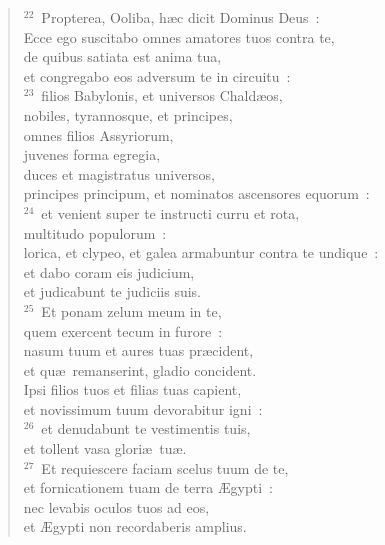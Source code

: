 \begin{verse}${}^{22}$~Propterea, Ooliba, h\ae c dicit Dominus Deus~:\\ Ecce ego suscitabo omnes amatores tuos contra te,\\ de quibus satiata est anima tua,\\ et congregabo eos adversum te in circuitu~:\\
${}^{23}$~filios Babylonis, et universos Chald\ae os,\\ nobiles, tyrannosque, et principes,\\ omnes filios Assyriorum,\\ juvenes forma egregia,\\ duces et magistratus universos,\\ principes principum, et nominatos ascensores equorum~:\\
${}^{24}$~et venient super te instructi curru et rota,\\ multitudo populorum~:\\ lorica, et clypeo, et galea armabuntur contra te undique~:\\ et dabo coram eis judicium,\\ et judicabunt te judiciis suis.\\
${}^{25}$~Et ponam zelum meum in te,\\ quem exercent tecum in furore~:\\ nasum tuum et aures tuas pr\ae cident,\\ et qu\ae\ remanserint, gladio concident.\\ Ipsi filios tuos et filias tuas capient,\\ et novissimum tuum devorabitur igni~:\\
${}^{26}$~et denudabunt te vestimentis tuis,\\ et tollent vasa glori\ae\ tu\ae .\\
${}^{27}$~Et requiescere faciam scelus tuum de te,\\ et fornicationem tuam de terra \AE gypti~:\\ nec levabis oculos tuos ad eos,\\ et \AE gypti non recordaberis amplius.\end{verse}



